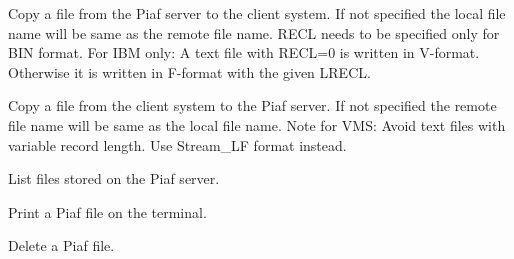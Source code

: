    \par
Copy a file from the Piaf server to the client system.  If not specified 
   the local file name will be same as the remote file name.  RECL needs to be 
   specified only for BIN format.  For IBM only: A text file with RECL=0 is 
   written in V-format.  Otherwise it is written in F-format with the given 
   LRECL.  

\ENDCMD


\BEGARG
{}
\ENDARG
{}
\ENDOPT

   \par
Copy a file from the client system to the Piaf server.  If not specified 
   the remote file name will be same as the local file name.  Note for VMS: 
   Avoid text files with variable record length.  Use Stream\_LF format 
   instead.  

\ENDCMD


\BEGARG
{}
\ENDARG

   \par
List files stored on the Piaf server.  

\ENDCMD


\BEGARG
{}
\ENDARG

   \par
Print a Piaf file on the terminal.  

\ENDCMD


\BEGARG
{}
\ENDARG

   \par
Delete a Piaf file.  

\ENDCMD


\BEGARG
{}
\ENDARG

